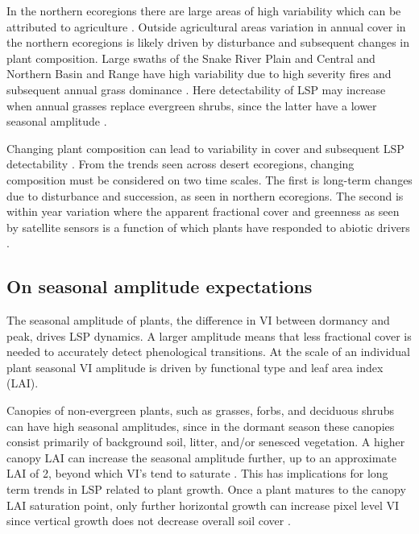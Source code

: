 \documentclass{article}
\begin{document}
In the northern ecoregions there are large areas of high variability which can be attributed to agriculture \cite{bradley2008}. Outside agricultural areas variation in annual cover in the northern ecoregions is likely driven by disturbance and subsequent changes in plant composition. Large swaths of the Snake River Plain and Central and Northern Basin and Range have high variability due to high severity fires and subsequent annual grass dominance \cite{bradley2018, pastick2020}. Here detectability of LSP may increase when annual grasses replace evergreen shrubs, since the latter have a lower seasonal amplitude \cite{peng2021}.  

Changing plant composition can lead to variability in cover and subsequent LSP detectability \cite{chen-wang2018}. From the trends seen across desert ecoregions, changing composition must be considered on two time scales. The first is long-term changes due to disturbance and succession, as seen in northern ecoregions. The second is within year variation where the apparent fractional cover and greenness as seen by satellite sensors is a function of which plants have responded to abiotic drivers \cite{helman2018}. 

\subsection{On seasonal amplitude expectations}
The seasonal amplitude of plants, the difference in VI between dormancy and peak, drives LSP dynamics. A larger amplitude means that less fractional cover is needed to accurately detect phenological transitions. At the scale of an individual plant seasonal VI amplitude is driven by functional type and leaf area index (LAI).

Canopies of non-evergreen plants, such as grasses, forbs, and deciduous shrubs can have high seasonal amplitudes, since in the dormant season these canopies consist primarily of background soil, litter, and/or senesced vegetation. A higher canopy LAI can increase the seasonal amplitude further, up to an approximate LAI of 2, beyond which VI’s tend to saturate \cite{smith2019}. This has implications for long term trends in LSP related to plant growth. Once a plant matures to the canopy LAI saturation point, only further horizontal growth can increase pixel level VI since vertical growth does not decrease overall soil cover \cite{gamon1995, carlson1997}.
\end{document}
